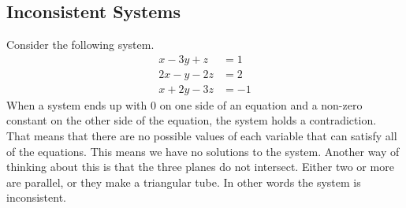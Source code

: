 \documentclass[12pt,fleqn]{book}
\begin{document}
\subsection*{Inconsistent Systems}
Consider the following system.
\begin{align*}
	x-3y+z  & =1  \\
	2x-y-2z & =2  \\
	x+2y-3z & =-1
\end{align*}
\vfill
When a system ends up with 0 on one side of an equation and a non-zero constant on the other side of the equation, the system holds a contradiction.  That means that there are no possible values of each variable that can satisfy all of the equations.  This means we have no solutions to the system.  Another way of thinking about this is that the three planes do not intersect.  Either two or more are parallel, or they make a triangular tube.  In other words the system is inconsistent.
\clearpage
\end{document}
